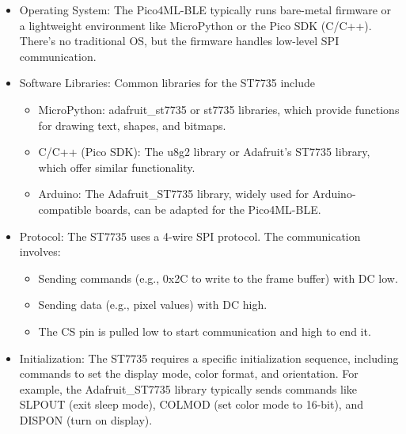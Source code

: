 \begin{itemize}

	\item Operating System: The Pico4ML-BLE typically runs bare-metal firmware or a lightweight environment like MicroPython or the Pico SDK (C/C++). There’s no traditional OS, but the firmware handles low-level SPI communication.

	

	\item Software Libraries: Common libraries for the ST7735 include

	\begin{itemize}

		\item MicroPython: adafruit\_st7735 or st7735 libraries, which provide functions for drawing text, shapes, and bitmaps.

		\item C/C++ (Pico SDK): The u8g2 library or Adafruit’s ST7735 library, which offer similar functionality.

		\item Arduino: The Adafruit\_ST7735 library, widely used for Arduino-compatible boards, can be adapted for the Pico4ML-BLE.

	\end{itemize}

	

	\item Protocol: The ST7735 uses a 4-wire SPI protocol. The communication involves:

	\begin{itemize}

		\item Sending commands (e.g., 0x2C to write to the frame buffer) with DC low.

		\item Sending data (e.g., pixel values) with DC high.

		\item The CS pin is pulled low to start communication and high to end it.

	\end{itemize}

	

	\item Initialization: The ST7735 requires a specific initialization sequence, including commands to set the display mode, color format, and orientation. For example, the Adafruit\_ST7735 library typically sends commands like SLPOUT (exit sleep mode), COLMOD (set color mode to 16-bit), and DISPON (turn on display).\cite{Sitronix:2010}

\end{itemize}



